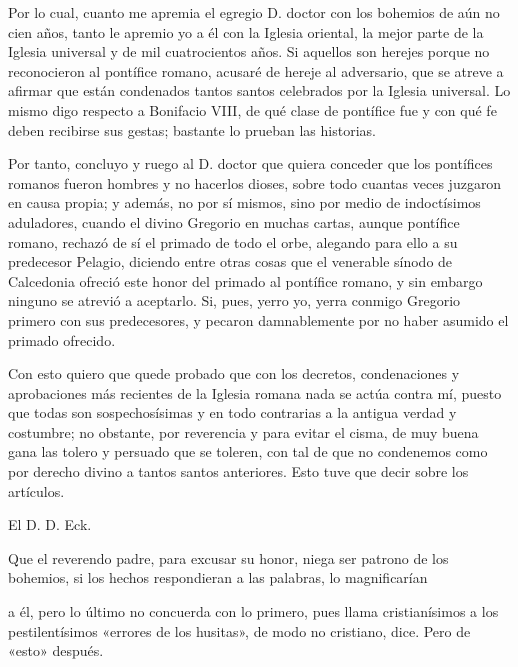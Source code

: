 Por lo cual, cuanto me apremia el egregio D. doctor con los bohemios de aún no cien años, tanto le apremio yo a él con la Iglesia oriental, la mejor parte de la Iglesia universal y de mil cuatrocientos años. Si aquellos son herejes porque no reconocieron al pontífice romano, acusaré de hereje al adversario, que se atreve a afirmar que están condenados tantos santos celebrados por la Iglesia universal. Lo mismo digo respecto a Bonifacio VIII, de qué clase de pontífice fue y con qué fe deben recibirse sus gestas; bastante lo prueban las historias.

Por tanto, concluyo y ruego al D. doctor que quiera conceder que los pontífices romanos fueron hombres y no hacerlos dioses, sobre todo cuantas veces juzgaron en causa propia; y además, no por sí mismos, sino por medio de indoctísimos aduladores, cuando el divino Gregorio en muchas cartas, aunque pontífice romano, rechazó de sí el primado de todo el orbe, alegando para ello a su predecesor Pelagio, diciendo entre otras cosas que el venerable sínodo de Calcedonia ofreció este honor del primado al pontífice romano, y sin embargo ninguno se atrevió a aceptarlo. Si, pues, yerro yo, yerra conmigo Gregorio primero con sus predecesores, y pecaron damnablemente por no haber asumido el primado ofrecido.

Con esto quiero que quede probado que con los decretos, condenaciones y aprobaciones más recientes de la Iglesia romana nada se actúa contra mí, puesto que todas son sospechosísimas y en todo contrarias a la antigua verdad y costumbre; no obstante, por reverencia y para evitar el cisma, de muy buena gana las tolero y persuado que se toleren, con tal de que no condenemos como por derecho divino a tantos santos anteriores. Esto tuve que decir sobre los artículos.

El D. D. Eck.

Que el reverendo padre, para excusar su honor, niega ser patrono de los bohemios, si los hechos respondieran a las palabras, lo magnificarían

a él, pero lo último no concuerda con lo primero, pues llama cristianísimos a los pestilentísimos «errores de los husitas», de modo no cristiano, dice. Pero de «esto» después.

